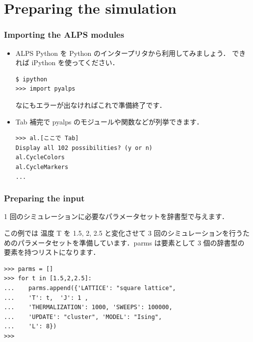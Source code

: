 \section{Preparing the simulation}
\begin{frame}[t,fragile]
 \frametitle{Importing the ALPS modules}

\begin{itemize}
 \item ALPS Python を Python のインタープリタから利用してみましょう．
       できれば iPython を使ってください．
       
       \begin{lstlisting}
$ ipython
>>> import pyalps
       \end{lstlisting}
       なにもエラーが出なければこれで準備終了です．


 \item Tab 補完で pyalps のモジュールや関数などが列挙できます．

       \begin{lstlisting}
>>> al.[ここで Tab]
Display all 102 possibilities? (y or n)
al.CycleColors   
al.CycleMarkers  
...            
       \end{lstlisting}
\end{itemize}
 
\end{frame}


\begin{frame}[t,fragile]
\frametitle{Preparing the input}

1 回のシミュレーションに必要なパラメータセットを辞書型で与えます．


この例では 温度 T を 1.5, 2, 2.5 と変化させて 3 回のシミュレーションを行うためのパラメータセットを準備しています．parms は要素として 3 個の辞書型の要素を持つリストになります．

\begin{lstlisting}
>>> parms = []
>>> for t in [1.5,2,2.5]:
...    parms.append({'LATTICE': "square lattice", 
...    'T': t,  'J': 1 ,
...    'THERMALIZATION': 1000, 'SWEEPS': 100000,
...    'UPDATE': "cluster", 'MODEL': "Ising",
...    'L': 8})
>>>
\end{lstlisting}

\end{frame}

